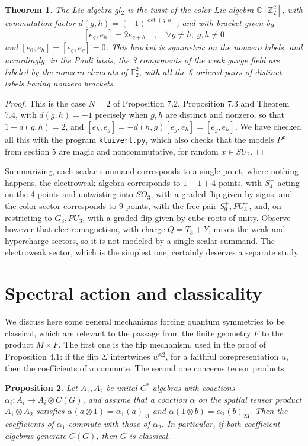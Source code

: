 \documentclass[11pt]{amsart}
\newtheorem{theorem}{Theorem}[section]
\newtheorem{proposition}[theorem]{Proposition}
\theoremstyle{definition}
\begin{document}
\begin{theorem}
The Lie algebra $gl_2$ is the twist of the color Lie algebra $\mathbb C[\mathbb Z_2^2]$, with commutation factor $d(g,h)=(-1)^{\det(g,h)}$, and with bracket given by
$$[e_g,e_h]=2e_{g+h}\quad,\quad\forall g\neq h,\ g,h\neq0$$
and $[e_0,e_h]=[e_g,e_g]=0$. This bracket is symmetric on the nonzero labels, and accordingly, in the Pauli basis, the 3 components of the weak gauge field are labeled by the nonzero elements of $\mathbb F_2^2$, with all the 6 ordered pairs of distinct labels having nonzero brackets.
\end{theorem}

\begin{proof}
This is the case $N=2$ of Proposition 7.2, Proposition 7.3 and Theorem 7.4, with $d(g,h)=-1$ precisely when $g,h$ are distinct and nonzero, so that $1-d(g,h)=2$, and $[e_h,e_g]=-d(h,g)[e_g,e_h]=[e_g,e_h]$. We have checked all this with the program {\tt kluivert.py}, which also checks that the models $P^x$ from section 5 are magic and noncommutative, for random $x\in SU_2$.
\end{proof}

Summarizing, each scalar summand corresponds to a single point, where nothing happens, the electroweak algebra corresponds to $1+1+4$ points, with $S_4^+$ acting on the 4 points and untwisting into $SO_3$, with a graded flip given by signs, and the color sector corresponds to $9$ points, with the free pair $S_9^+,PU_3^+$, and, on restricting to $G_3,PU_3$, with a graded flip given by cube roots of unity. Observe however that electromagnetism, with charge $Q=T_3+Y$, mixes the weak and hypercharge sectors, so it is not modeled by a single scalar summand. The electroweak sector, which is the simplest one, certainly deserves a separate study.

\section{Spectral action and classicality}

We discuss here some general mechanisms forcing quantum symmetries to be classical, which are relevant to the passage from the finite geometry $F$ to the product $M\times F$. The first one is the flip mechanism, used in the proof of Proposition 4.1: if the flip $\Sigma$ intertwines $u^{\otimes2}$, for a faithful corepresentation $u$, then the coefficients of $u$ commute. The second one concerns tensor products:

\begin{proposition}
Let $A_1,A_2$ be unital $C^*$-algebras with coactions $\alpha_i:A_i\to A_i\otimes C(G)$, and assume that a coaction $\alpha$ on the spatial tensor product $A_1\otimes A_2$ satisfies $\alpha(a\otimes1)=\alpha_1(a)_{13}$ and $\alpha(1\otimes b)=\alpha_2(b)_{23}$. Then the coefficients of $\alpha_1$ commute with those of $\alpha_2$. In particular, if both coefficient algebras generate $C(G)$, then $G$ is classical.
\end{proposition}
\end{document}
